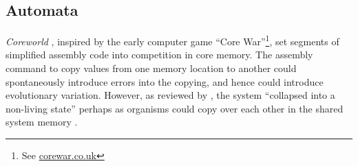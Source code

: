 %
%
%
%
%
%
%
%
%
%
\subsection{Automata}

\emph{Coreworld} \parencite{Rasmussen1990}, inspired by the early computer game ``Core War''\footnote{See \url{corewar.co.uk}}, set segments of simplified assembly code into competition in core memory. The assembly command to copy values from one memory location to another could spontaneously introduce errors into the copying, and hence could introduce evolutionary variation. However, as reviewed by \textcite{Ofria2004}, the system ``collapsed into a non-living state'' perhaps as organisms could copy over each other in the shared system memory \parencite{Ofria2004}.

